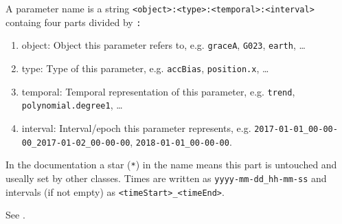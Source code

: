 A parameter name is a string \verb|<object>:<type>:<temporal>:<interval>| containg four parts divided by \verb|:|
\begin{enumerate}
\item object: Object this parameter refers to, e.g. \verb|graceA|, \verb|G023|, \verb|earth|, \ldots
\item type: Type of this parameter, e.g. \verb|accBias|, \verb|position.x|, \ldots
\item temporal: Temporal representation of this parameter, e.g. \verb|trend|, \verb|polynomial.degree1|, \ldots
\item interval: Interval/epoch this parameter represents, e.g. \verb|2017-01-01_00-00-00_2017-01-02_00-00-00|, \verb|2018-01-01_00-00-00|.
\end{enumerate}
In the documentation a star (\verb|*|) in the name means this part is untouched and useally set by other classes.
Times are written as \verb|yyyy-mm-dd_hh-mm-ss| and intervals (if not empty) as \verb|<timeStart>_<timeEnd>|.

See .

